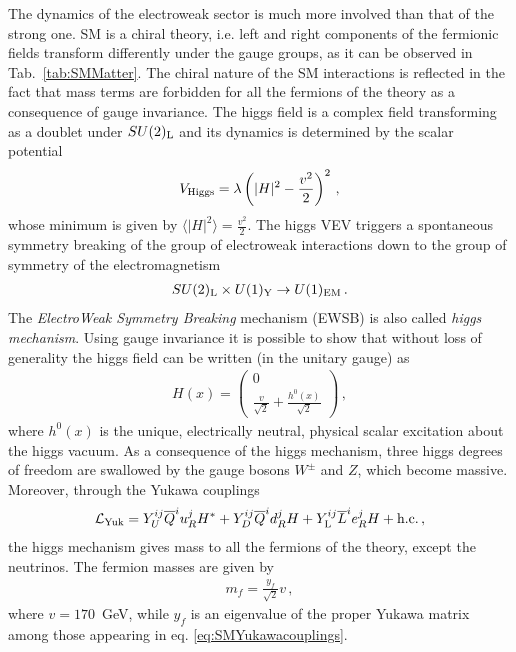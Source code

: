 \documentclass[12pt,a4paper]{book}
\begin{document}
The dynamics of the electroweak sector is much more involved than that of the strong one. SM is a chiral theory, i.e. left and right components of the fermionic fields transform differently under the gauge groups, as it can be observed in Tab.~\ref{tab:SMMatter}. The chiral nature of the SM interactions is reflected in the fact that mass terms are forbidden for all the fermions of the theory as a consequence of gauge invariance. The higgs field is a complex field transforming as a doublet under $SU(2)_{\rm L}$ and its dynamics is determined by the scalar potential
\begin{align}
\label{eq:HiggsPotential}
V_{\rm Higgs} = \lambda \left(|H|^2 - \frac{v^2}{2}\right)^2 \,,
\end{align}
whose minimum is given by $\langle \left|H\right|^2\rangle = \frac{v^2}{2}$. The higgs VEV triggers a spontaneous symmetry breaking of the group of electroweak interactions down to the group of symmetry of the electromagnetism
\begin{align}
\label{eq:SMSymmetryBreaking}
SU(2)_{\rm L} \times U(1)_{\rm Y} \rightarrow U(1)_{\rm EM}\,.
\end{align}
The \textit{ElectroWeak Symmetry Breaking} mechanism (EWSB) is also called \textit{higgs mechanism}. Using gauge invariance it is possible to show that without loss of generality the higgs field can be written (in the unitary gauge) as
\begin{align}
\label{eq:HiggsFieldUnitaryGauge}
H(x) = \begin{pmatrix} 0 \\ \frac{v}{\sqrt{2}} + \frac{h^0(x)}{\sqrt{2}} \end{pmatrix}\,,
\end{align}
where $h^0(x)$ is the unique, electrically neutral, physical scalar excitation about the higgs vacuum. As a consequence of the higgs mechanism, three higgs degrees of freedom are swallowed by the gauge bosons $W^\pm$ and $Z$, which become massive. Moreover, through the Yukawa couplings
\begin{align}
\label{eq:SMYukawacouplings}
\mathcal{L}_{\rm Yuk} = Y^{ij}_U \overline{Q}^i u^j_R H^* + Y^{ij}_D \overline{Q}^i d^j_R H + Y^{ij}_{\rm L} \overline{L}^i e^j_R H + \text{h.c.} \,,
\end{align}
the higgs mechanism gives mass to all the fermions of the theory, except the neutrinos. The fermion masses are given by
\begin{align}
\label{eq:FermionMasses}
m_f = \frac{y_f}{\sqrt{2}} v\,,
\end{align}
where $v = 170 \,$ GeV, while $y_f$ is an eigenvalue of the proper Yukawa matrix among those appearing in eq. \eqref{eq:SMYukawacouplings}.\\
\end{document}
